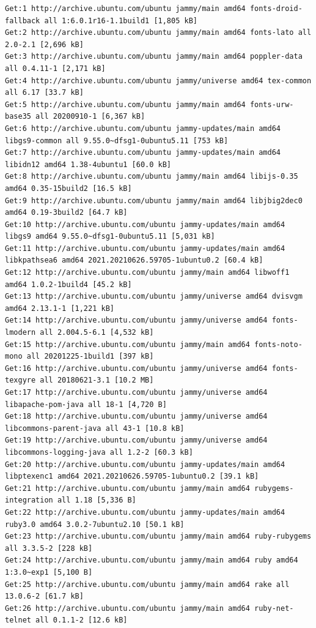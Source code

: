 \documentclass[
  11pt,
  letterpaper,
]{book}
\begin{document}
\begin{verbatim}
Get:1 http://archive.ubuntu.com/ubuntu jammy/main amd64 fonts-droid-fallback all 1:6.0.1r16-1.1build1 [1,805 kB]
Get:2 http://archive.ubuntu.com/ubuntu jammy/main amd64 fonts-lato all 2.0-2.1 [2,696 kB]
Get:3 http://archive.ubuntu.com/ubuntu jammy/main amd64 poppler-data all 0.4.11-1 [2,171 kB]
Get:4 http://archive.ubuntu.com/ubuntu jammy/universe amd64 tex-common all 6.17 [33.7 kB]
Get:5 http://archive.ubuntu.com/ubuntu jammy/main amd64 fonts-urw-base35 all 20200910-1 [6,367 kB]
Get:6 http://archive.ubuntu.com/ubuntu jammy-updates/main amd64 libgs9-common all 9.55.0~dfsg1-0ubuntu5.11 [753 kB]
Get:7 http://archive.ubuntu.com/ubuntu jammy-updates/main amd64 libidn12 amd64 1.38-4ubuntu1 [60.0 kB]
Get:8 http://archive.ubuntu.com/ubuntu jammy/main amd64 libijs-0.35 amd64 0.35-15build2 [16.5 kB]
Get:9 http://archive.ubuntu.com/ubuntu jammy/main amd64 libjbig2dec0 amd64 0.19-3build2 [64.7 kB]
Get:10 http://archive.ubuntu.com/ubuntu jammy-updates/main amd64 libgs9 amd64 9.55.0~dfsg1-0ubuntu5.11 [5,031 kB]
Get:11 http://archive.ubuntu.com/ubuntu jammy-updates/main amd64 libkpathsea6 amd64 2021.20210626.59705-1ubuntu0.2 [60.4 kB]
Get:12 http://archive.ubuntu.com/ubuntu jammy/main amd64 libwoff1 amd64 1.0.2-1build4 [45.2 kB]
Get:13 http://archive.ubuntu.com/ubuntu jammy/universe amd64 dvisvgm amd64 2.13.1-1 [1,221 kB]
Get:14 http://archive.ubuntu.com/ubuntu jammy/universe amd64 fonts-lmodern all 2.004.5-6.1 [4,532 kB]
Get:15 http://archive.ubuntu.com/ubuntu jammy/main amd64 fonts-noto-mono all 20201225-1build1 [397 kB]
Get:16 http://archive.ubuntu.com/ubuntu jammy/universe amd64 fonts-texgyre all 20180621-3.1 [10.2 MB]
Get:17 http://archive.ubuntu.com/ubuntu jammy/universe amd64 libapache-pom-java all 18-1 [4,720 B]
Get:18 http://archive.ubuntu.com/ubuntu jammy/universe amd64 libcommons-parent-java all 43-1 [10.8 kB]
Get:19 http://archive.ubuntu.com/ubuntu jammy/universe amd64 libcommons-logging-java all 1.2-2 [60.3 kB]
Get:20 http://archive.ubuntu.com/ubuntu jammy-updates/main amd64 libptexenc1 amd64 2021.20210626.59705-1ubuntu0.2 [39.1 kB]
Get:21 http://archive.ubuntu.com/ubuntu jammy/main amd64 rubygems-integration all 1.18 [5,336 B]
Get:22 http://archive.ubuntu.com/ubuntu jammy-updates/main amd64 ruby3.0 amd64 3.0.2-7ubuntu2.10 [50.1 kB]
Get:23 http://archive.ubuntu.com/ubuntu jammy/main amd64 ruby-rubygems all 3.3.5-2 [228 kB]
Get:24 http://archive.ubuntu.com/ubuntu jammy/main amd64 ruby amd64 1:3.0~exp1 [5,100 B]
Get:25 http://archive.ubuntu.com/ubuntu jammy/main amd64 rake all 13.0.6-2 [61.7 kB]
Get:26 http://archive.ubuntu.com/ubuntu jammy/main amd64 ruby-net-telnet all 0.1.1-2 [12.6 kB]

\end{verbatim}
\end{document}
